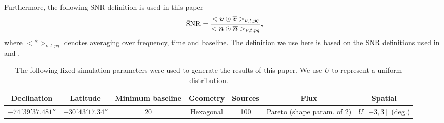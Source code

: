 \documentclass[useAMS,usenatbib]{mn2e}
\newcommand{\bv}{\bmath{v}}
\newcommand{\bn}{\bmath{n}}
\newcommand{\conj}[1]{\overline{#1}}
\begin{document}
Furthermore, the following SNR definition is used in this paper  
\begin{equation}
\label{}
\textrm{SNR} = \frac{<\bv\odot\conj{\bv}>_{\nu,t,pq}}{<\bn\odot\conj{\bn}>_{\nu,t,pq}}, 
\end{equation}
where $<*>_{\nu,t,pq}$ denotes averaging over frequency, time and baseline. The definition we use here is based on the SNR definitions used in \citet{Liu2010} and \citet{Marthi2014}.




\begin{table}
\centering
\caption{The following fixed simulation parameters were used to generate the results of this paper. We use $U$ to represent 
a uniform distribution.}
\begin{tabular}{|c c c c c c c|} 
\hline
Declination & Latitude & Minimum baseline & Geometry& Sources & Flux & Spatial \\
\hline 
\hline
 $-74^{\circ}39'37.481''$ & $-30^{\circ}43'17.34''$ & 20 & Hexagonal &100 & Pareto (shape param. of 2) & $U[-3,3]$ (deg.) 
\end{tabular}
\label{tab:fixed_parm}
\end{table}
\end{document}
